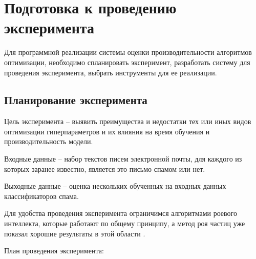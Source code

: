 \section{Подготовка к проведению эксперимента}

Для программной реализации системы оценки производительности
алгоритмов оптимизации, необходимо спланировать эксперимент,
разработать систему для проведения эксперимента, выбрать инструменты для ее реализации.

\subsection{Планирование эксперимента}

Цель эксперимента -- выявить преимущества и недостатки тех или иных видов
оптимизации гиперпараметров и их влияния на время обучения и производительность
модели.

Входные данные -- набор текстов писем электронной почты, для каждого из которых
заранее известно, является это письмо спамом или нет.

Выходные данные -- оценка нескольких обученных на входных данных классификаторов спама.

Для удобства проведения эксперимента ограничимся алгоритмами роевого интеллекта,
которые работают по общему принципу, а метод роя частиц уже показал хорошие
результаты в этой области \cite{IEEE}.

План проведения эксперимента:

